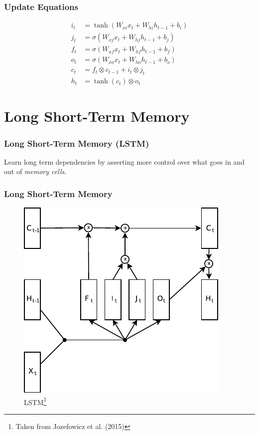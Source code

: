 \documentclass[utf8x,hyperref={pdfpagelabels=false}]{beamer}
\begin{document}
\begin{frame}
    \frametitle{Update Equations}
    \begin{align*}
        i_t &= \tanh(W_{xi}x_t + W_{hi}h_{t-1} + b_i)\\
        j_t &= \sigma(W_{xj}x_t + W_{hj}h_{t-1} + b_j)\\
        f_t &= \sigma(W_{xf}x_t + W_{hf}h_{t-1} + b_f)\\
        o_t &= \sigma(W_{xo}x_t + W_{ho}h_{t-1} + b_o)\\
        c_t &= f_t \otimes c_{t-1} + i_t \otimes j_t\\
        h_t &= \tanh(c_t) \otimes o_t
    \end{align*}
\end{frame}

\section{Long Short-Term Memory}
\begin{frame}
    \frametitle{Long Short-Term Memory (LSTM)}
    Learn long term dependencies by asserting more control over what goes in and out of \emph{memory cells}.
\end{frame}

\begin{frame}
\frametitle{Long Short-Term Memory}
\begin{figure}[t]
\centering
\includegraphics{lstmjozefowicz15}
\caption{LSTM\footnote{Taken from Jozefowicz et al. (2015)}}
\end{figure}
\end{frame}
\end{document}
